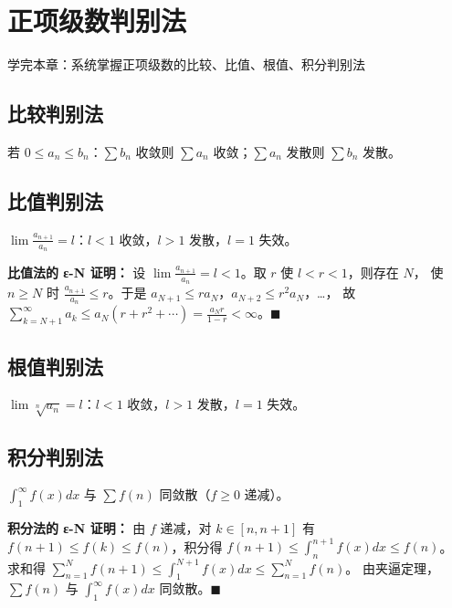 \chapter{正项级数判别法}
\begin{applicationbox}
学完本章：系统掌握正项级数的比较、比值、根值、积分判别法
\end{applicationbox}
\section{比较判别法} 若 \(0\le a_n\le b_n\)：\(\sum b_n\) 收敛则 \(\sum a_n\) 收敛；\(\sum a_n\) 发散则 \(\sum b_n\) 发散。

\section{比值判别法} \(\lim\frac{a_{n+1}}{a_n}=l\)：\(l<1\) 收敛，\(l>1\) 发散，\(l=1\) 失效。

\textbf{比值法的 ε-N 证明：} 设 \(\lim\frac{a_{n+1}}{a_n}=l<1\)。取 \(r\) 使 \(l<r<1\)，则存在 \(N\)，
使 \(n\ge N\) 时 \(\frac{a_{n+1}}{a_n}\le r\)。于是 \(a_{N+1}\le r a_N\)，\(a_{N+2}\le r^2 a_N\)，…，
故 \(\sum_{k=N+1}^\infty a_k\le a_N(r+r^2+\cdots)=\frac{a_N r}{1-r}<\infty\)。\(\blacksquare\)

\section{根值判别法} \(\lim\sqrt[n]{a_n}=l\)：\(l<1\) 收敛，\(l>1\) 发散，\(l=1\) 失效。

\section{积分判别法} \(\int_1^\infty f(x)dx\) 与 \(\sum f(n)\) 同敛散（\(f\ge0\) 递减）。

\textbf{积分法的 ε-N 证明：} 由 \(f\) 递减，对 \(k\in[n,n+1]\) 有
\(f(n+1)\le f(k)\le f(n)\)，积分得 \(f(n+1)\le\int_n^{n+1}f(x)dx\le f(n)\)。
求和得 \(\sum_{n=1}^N f(n+1)\le\int_1^{N+1}f(x)dx\le\sum_{n=1}^N f(n)\)。
由夹逼定理，\(\sum f(n)\) 与 \(\int_1^\infty f(x)dx\) 同敛散。\(\blacksquare\)
